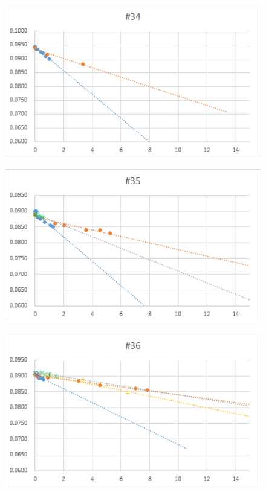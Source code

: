   \begin{figure}[htbp]
    \centering
       \includegraphics[width=120mm]{vol_034.png}
  \end{figure}
  \begin{figure}[htbp]
    \centering
       \includegraphics[width=120mm]{vol_035.png}
  \end{figure}
  \begin{figure}[htbp]
    \centering
       \includegraphics[width=120mm]{vol_036.png}
  \end{figure}
